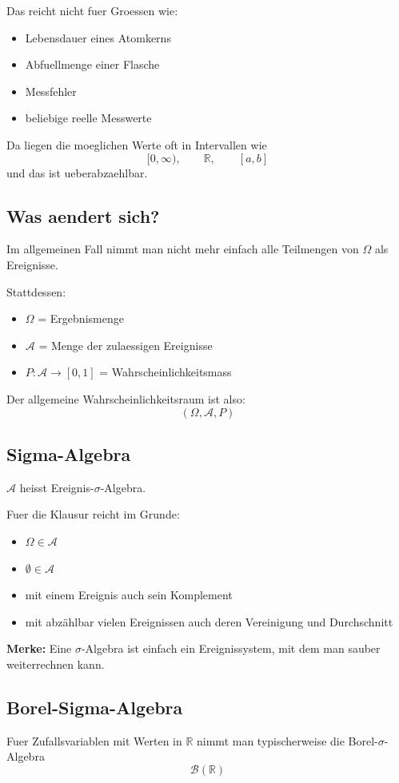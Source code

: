 \documentclass[a4paper,11pt]{article}
\begin{document}
Das reicht nicht fuer Groessen wie:
\begin{itemize}
  \item Lebensdauer eines Atomkerns
  \item Abfuellmenge einer Flasche
  \item Messfehler
  \item beliebige reelle Messwerte
\end{itemize}

Da liegen die moeglichen Werte oft in Intervallen wie
\[
[0,\infty),\qquad \mathbb{R},\qquad [a,b]
\]
und das ist ueberabzaehlbar.

\subsection{Was aendert sich?}
Im allgemeinen Fall nimmt man nicht mehr einfach alle Teilmengen von $\Omega$ als Ereignisse.

Stattdessen:
\begin{itemize}
  \item $\Omega$ = Ergebnismenge
  \item $\mathcal A$ = Menge der zulaessigen Ereignisse
  \item $P:\mathcal A \to [0,1]$ = Wahrscheinlichkeitsmass
\end{itemize}

Der allgemeine Wahrscheinlichkeitsraum ist also:
\[
(\Omega,\mathcal A,P)
\]

\subsection{Sigma-Algebra}
$\mathcal A$ heisst Ereignis-$\sigma$-Algebra.

Fuer die Klausur reicht im Grunde:
\begin{itemize}
  \item $\Omega \in \mathcal A$
  \item $\emptyset \in \mathcal A$
  \item mit einem Ereignis auch sein Komplement
  \item mit abz\"ahlbar vielen Ereignissen auch deren Vereinigung und Durchschnitt
\end{itemize}

\textbf{Merke:}
Eine $\sigma$-Algebra ist einfach ein Ereignissystem, mit dem man sauber weiterrechnen kann.

\subsection{Borel-Sigma-Algebra}
Fuer Zufallsvariablen mit Werten in $\mathbb R$ nimmt man typischerweise die Borel-$\sigma$-Algebra
\[
\mathcal B(\mathbb R)
\]
\end{document}
